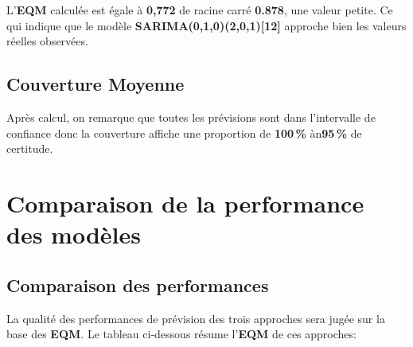 \documentclass[
12pt,          %
a4paper,       %
oneside,       %
openright      %
]{report}
\begin{document}
 	
 	\begin{table}[H]
 		\centering
 		
 		\caption{Erreur quadratique moyenne--- SARIMA(0,1,0)(2,0,1)[12]}
 		\label{tab:eqm_sarima}
 	\end{table}
 	
  L'\textbf{EQM} calculée est égale à \textbf{0,772} de racine carré \textbf{0.878}, une valeur petite. Ce qui indique que le modèle \textbf{SARIMA(0,1,0)(2,0,1)[12]} approche bien les valeurs réelles observées.
  
  \section{ Couverture Moyenne}
  
  	\begin{table}[H]
  	\centering
  	
  	\caption{Couverture de l'intervalle de confiance à 95\,\% --- Prévision SARIMA(0,1,0)(2,0,1)[12]}
  	\label{tab:couverture_ic_sarima}
  \end{table}
  
  Après calcul, on remarque que toutes les prévisions sont dans l'intervalle de confiance donc la couverture affiche une proportion de \textbf{100\,\%} àn\textbf{95\,\%} de certitude.
  
  
  
  \chapter{Comparaison de la performance des modèles}
  
  \section{Comparaison des performances }
  
  La qualité des performances de prévision des trois approches sera jugée sur la base des \textbf{EQM}. Le tableau ci-dessous résume l'\textbf{EQM} de ces approches: 
  
  \begin{table}[H]
  	\centering
  	
  	\caption{Comparaison des approches}
  	\label{tab:comparaison_approche}
  \end{table}
  
\end{document}
